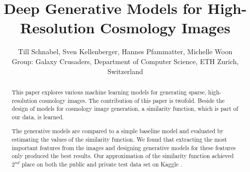 \documentclass[10pt,conference,compsocconf]{IEEEtran}
\newcommand\TODO[1]{\textcolor{red}{#1}} %
\begin{document}
\title{Deep Generative Models for High-Resolution Cosmology Images}

\author{Till Schnabel, Sven Kellenberger, Hannes Pfammatter, Michelle Woon \\Group: Galaxy Crusaders, Department of Computer Science, ETH Zurich, Switzerland}

\maketitle

\begin{abstract}
This paper explores various machine learning models for generating sparse, high-resolution cosmology images. %
The contribution of this paper is twofold. Beside the design of models for cosmology image generation, a similarity function, which is part of our data, is learned.

The generative models are compared to a simple baseline model and evaluated by estimating the values of the similarity function. We found that extracting the most important features from the images and designing generative models for these features only produced the best results. Our approximation of the similarity function achieved $2^{nd}$ place on both the public and private test data set on Kaggle \cite{Kaggle}.




\end{abstract}
\end{document}
